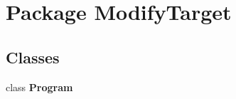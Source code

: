 \hypertarget{namespace_modify_target}{\section{Package Modify\-Target}
\label{namespace_modify_target}
}
\subsection*{Classes}
\begin{DoxyCompactItemize}
\item 
class {\bfseries Program}
\end{DoxyCompactItemize}
